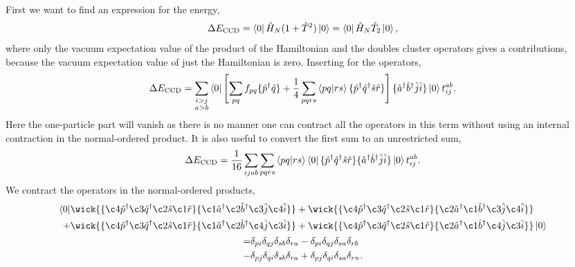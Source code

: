 First we want to find an expression for the energy,
\begin{equation}
    \Delta E_{\text{CCD}} = \bra{0}\hat{H}_N (1 + \hat{T}^2) \ket{0}
        = \bra{0} \hat{H}_N \hat{T}_2 \ket{0},
\end{equation}
where only the vacuum expectation value of the product of the Hamiltonian and the 
doubles cluster operators gives a contributions, because the vacuum expectation value
of just the Hamiltonian is zero. Inserting for the operators,
\begin{equation}
    \Delta E_{\text{CCD}} 
        = \sum_{\substack{i>j \\ a>b}}\bra{0}\left[ 
        \sum_{pq} f_{pq} \{\hat{p}^\dagger \hat{q}\}
        + \frac{1}{4}\sum_{pqrs}\bra{pq} \ket{rs} \{\hat{p}^\dagger\hat{q}^\dagger\hat{s}\hat{r}\}
        \right] 
        \{\hat{a}^\dagger\hat{b}^\dagger\hat{j}\hat{i} \}
        \ket{0}t^{ab}_{ij}.
\end{equation}
Here the one-particle part will vanish as there is no manner one can contract all the
operators in this term without using an internal contraction in the normal-ordered
product. It is also useful to convert the first sum to an unrestricted sum,
\begin{equation}
    \Delta E_{\text{CCD}}
        = \frac{1}{16}\sum_{ijab}\sum_{pqrs}\bra{pq} \ket{rs} 
           \bra{0} 
           \{\hat{p}^\dagger\hat{q}^\dagger\hat{s}\hat{r}\} 
           \{\hat{a}^\dagger\hat{b}^\dagger\hat{j}\hat{i} \}
           \ket{0} t^{ab}_{ij}.
\end{equation}
We contract the operators in the normal-ordered products,
\begin{gather}
    \begin{aligned}
         \bra{0}
            &\wick{
            \{\c4{\hat{p}}^\dagger \c3{\hat{q}}^\dagger \c2{\hat{s}} \c1{\hat{r}} \} 
            \{\c1{\hat{a}}^\dagger \c2{\hat{b}}^\dagger \c3{\hat{j}} \c4{\hat{i}} \} 
            }
            +
            \wick{
            \{\c4{\hat{p}}^\dagger \c3{\hat{q}}^\dagger \c2{\hat{s}} \c1{\hat{r}} \} 
            \{\c2{\hat{a}}^\dagger \c1{\hat{b}}^\dagger \c3{\hat{j}} \c4{\hat{i}} \}
            } \\
            +
            &\wick{
            \{\c4{\hat{p}}^\dagger \c3{\hat{q}}^\dagger \c2{\hat{s}} \c1{\hat{r}} \} 
            \{\c1{\hat{a}}^\dagger \c2{\hat{b}}^\dagger \c4{\hat{j}} \c3{\hat{i}} \}
            }
            +
            \wick{
            \{\c4{\hat{p}}^\dagger \c3{\hat{q}}^\dagger \c2{\hat{s}} \c1{\hat{r}} \} 
            \{\c2{\hat{a}}^\dagger \c1{\hat{b}}^\dagger \c4{\hat{j}} \c3{\hat{i}} \}
            }
         \ket{0}
    \end{aligned} \\
    \begin{aligned}
        = &\delta_{pi}\delta_{qj}\delta_{sb}\delta_{ra} 
        - \delta_{pi}\delta_{qj}\delta_{sa}\delta_{rb} \\
        - &\delta_{pj}\delta_{qi}\delta_{sb}\delta_{ra} 
        + \delta_{pj}\delta_{qi}\delta_{sa}\delta_{rn}. 
    \end{aligned} 
\end{gather}
